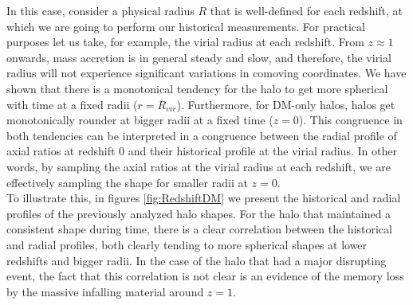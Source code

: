 In this case, consider a physical radius $R$ that is well-defined for each redshift, at which we are going to perform our historical measurements. For practical purposes let us take, for example, the virial radius at each redshift. From $z\approx 1$ onwards, mass accretion is in general steady and slow, and therefore, the virial radius will not experience significant variations in comoving coordinates. We have shown that there is a monotonical tendency for the halo to get more spherical with time at a fixed radii ($r=R_{vir}$). Furthermore, for DM-only halos, halos get monotonically rounder at bigger radii at a fixed time ($z=0$). This congruence in both tendencies can be interpreted in a congruence between the radial profile of axial ratios at redshift 0 and their historical profile at the virial radius. In other words, by sampling the axial ratios at the virial radius at each redshift, we are effectively sampling the shape for smaller radii at $z=0$. \\

To illustrate this, in figures \ref{fig:RedshiftDM} we present the historical and radial profiles of the previously analyzed halo shapes. For the halo that maintained a consistent shape during time, there is a clear correlation between the historical and radial profiles, both clearly tending to more spherical shapes at lower redshifts and bigger radii. In the case of the halo that had a major disrupting event, the fact that this correlation is not clear is an evidence of the memory loss by the massive infalling material around $z=1$.\\  

